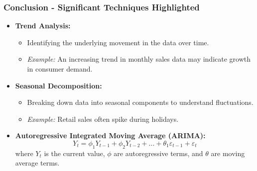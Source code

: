 \documentclass[aspectratio=169]{beamer}
\begin{document}
\begin{frame}[fragile]
    \frametitle{Conclusion - Significant Techniques Highlighted}
    \begin{itemize}
        \item \textbf{Trend Analysis:}
        \begin{itemize}
            \item Identifying the underlying movement in the data over time.
            \item \textit{Example:} An increasing trend in monthly sales data may indicate growth in consumer demand.
        \end{itemize}
        
        \item \textbf{Seasonal Decomposition:}
        \begin{itemize}
            \item Breaking down data into seasonal components to understand fluctuations.
            \item \textit{Example:} Retail sales often spike during holidays.
        \end{itemize}

        \item \textbf{Autoregressive Integrated Moving Average (ARIMA):}
        \begin{equation}
        Y_t = \phi_1 Y_{t-1} + \phi_2 Y_{t-2} + ... + \theta_1 \varepsilon_{t-1} + \varepsilon_t
        \end{equation}
        where \( Y_t \) is the current value, \( \phi \) are autoregressive terms, and \( \theta \) are moving average terms.
    \end{itemize}
\end{frame}
\end{document}
